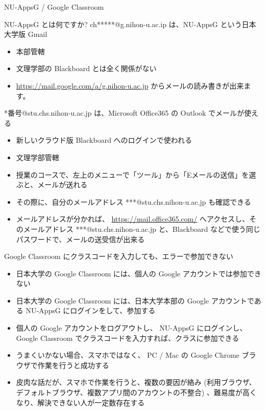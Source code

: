 \documentclass[a4j,10pt]{jsarticle}
\begin{document}
{\newpage\clearpage
{}%
\begin{frame}[label={sec:orgbe869cf},fragile]{NU-AppsG / Google Classroom}
\begin{block}{NU-AppsG とは何ですか?}
ch*****@g.nihon-u.ac.ip は、NU-AppsG という日本大学版 Gmail
\begin{itemize}
\item 本部管轄
\item 文理学部の Blackboard とは全く関係がない
\item \url{https://mail.google.com/a/g.nihon-u.ac.jp}
からメールの読み書きが出来ます。
\end{itemize}
\par
*番号@stu.chs.nihon-u.ac.jp は、Microsoft Office365 の Outlook でメールが使える
\begin{itemize}
\item 新しいクラウド版 Blackboard へのログインで使われる
\item 文理学部管轄
\item 授業のコースで、左上のメニューで「ツール」から「Eメールの送信」を選ぶと、メールが送れる
\item その際に、自分のメールアドレス ***@stu.chs.nihon-u.ac.jp も確認できる
\item メールアドレスが分かれば、
\url{https://mail.office365.com/}
へアクセスし、そのメールアドレス ***@stu.chs.nihon-u.ac.jp と、Blackboard などで使う同じパスワードで、メールの送受信が出来る
\end{itemize}
\end{block}
\par
\begin{block}{Google Classroom にクラスコードを入力しても、エラーで参加できない}
\begin{itemize}
\item 日本大学の Google Classroom には、個人の Google アカウントでは参加できない
\item 日本大学の Google Classroom には、日本大学本部の Google アカウントである NU-AppsG にログインをして、参加する
\item 個人の Google アカウントをログアウトし、 NU-AppsG にログインし、 Google Classroom でクラスコードを入力すれば、クラスに参加できる
\item うまくいかない場合、スマホではなく、 PC / Mac の Google Chrome ブラウザで作業を行うと成功する
\item 皮肉な話だが、スマホで作業を行うと、複数の要因が絡み (利用ブラウザ、デフォルトブラウザ、複数アプリ間のアカウントの不整合) 、難易度が高くなり、解決できない人が一定数存在する

\end{itemize}
\end{block}
\end{frame}}
\end{document}
